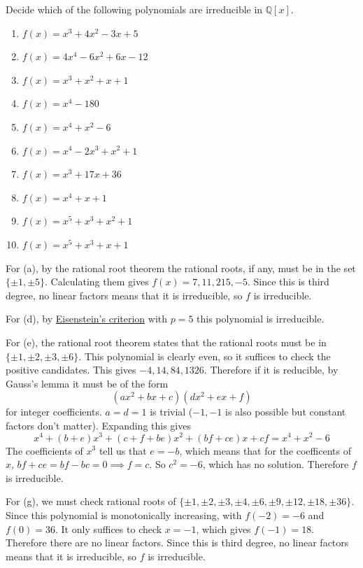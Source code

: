   \begin{exercise}[Shifrin 3.3.2.a/d/e/g]
    Decide which of the following polynomials are irreducible in
    $\mathbb{Q}[x]$.
    \begin{enumerate}
      \item[a] $f(x) = x^3 + 4x^2 - 3x + 5$
      \item $f(x) = 4x^4 - 6x^2 + 6x - 12$
      \item $f(x) = x^3 + x^2 + x + 1$
      \item[d] $f(x) = x^4 - 180$
      \item[e] $f(x) = x^4 + x^2 - 6$
      \item $f(x) = x^4 - 2x^3 + x^2 + 1$
      \item[g] $f(x) = x^3 + 17x + 36$
      \item $f(x) = x^4 + x + 1$
      \item $f(x) = x^5 + x^3 + x^2 + 1$
      \item $f(x) = x^5 + x^3 + x + 1$
    \end{enumerate}
  \end{exercise}
  \begin{solution}
    For (a), by the rational root theorem the rational roots, if any, must be in the set $\{\pm 1, \pm 5\}$. Calculating them gives $f(x) = 7, 11, 215, -5$. Since this is third degree, no linear factors means that it is irreducible, so $f$ is irreducible. 

    For (d), by \hyperref[thm:eisensteins-criterion]{Eisenstein's criterion} with $p = 5$ this polynomial is irreducible. 

    For (e), the rational root theorem states that the rational roots must be in $\{\pm 1, \pm 2, \pm 3, \pm 6\}$. This polynomial is clearly even, so it suffices to check the positive candidates. This gives $-4, 14, 84, 1326$. Therefore if it is reducible, by Gauss's lemma it must be of the form 
    \begin{equation}
      (ax^2 + bx + c)(dx^2 + ex + f)
    \end{equation} 
    for integer coefficients. $a = d = 1$ is trivial ($-1, -1$ is also possible but constant factors don't matter). Expanding this gives 
    \begin{equation}
      x^4 + (b + e) x^3 + (c + f + be) x^2 + (bf + ce) x + cf = x^4 + x^2 - 6
    \end{equation}
    The coefficients of $x^3$ tell us that $e = -b$, which means that for the coefficents of $x$, $bf + ce = bf - bc = 0 \implies f = c$. So $c^2 = -6$, which has no solution. Therefore $f$ is irreducible. 

    For (g), we must check rational roots of $\{\pm1, \pm2, \pm3, \pm4, \pm6, \pm9, \pm12, \pm18, \pm36\}$. Since this polynomial is monotonically increasing, with $f(-2) = -6$ and $f(0) = 36$. It only suffices to check $x = -1$, which gives $f(-1) = 18$. Therefore there are no linear factors. Since this is third degree, no linear factors means that it is irreducible, so $f$ is irreducible. 
  \end{solution}

